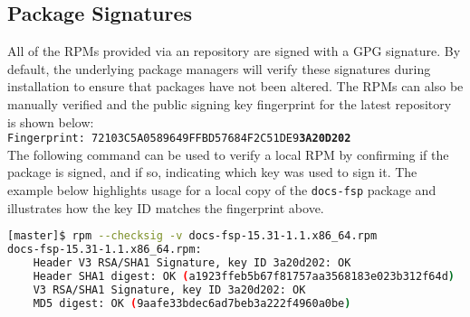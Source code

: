 \clearpage
\subsection{Package Signatures}

All of the RPMs provided via an \OHPC{} repository are signed with a GPG
signature. By default, the underlying package managers will verify these signatures during
installation to ensure that packages have not been altered. The RPMs can also
be manually verified and the public signing key fingerprint for the latest
repository is shown below: \\

\texttt{Fingerprint: 72103C5A0589649FFBD57684F2C51DE9{\bf3A20D202}} \\

\noindent The following command can be used to verify a local RPM by confirming if the package
is signed, and if so, indicating which key was used to sign it.  The example
below highlights usage for a local copy of the \texttt{docs-fsp} package and
illustrates how the key ID matches the fingerprint above.

\begin{lstlisting}[language=bash,keywords={}]
[master]$ rpm --checksig -v docs-fsp-15.31-1.1.x86_64.rpm
docs-fsp-15.31-1.1.x86_64.rpm:
    Header V3 RSA/SHA1 Signature, key ID 3a20d202: OK
    Header SHA1 digest: OK (a1923ffeb5b67f81757aa3568183e023b312f64d)
    V3 RSA/SHA1 Signature, key ID 3a20d202: OK
    MD5 digest: OK (9aafe33bdec6ad7beb3a222f4960a0be)
\end{lstlisting}



